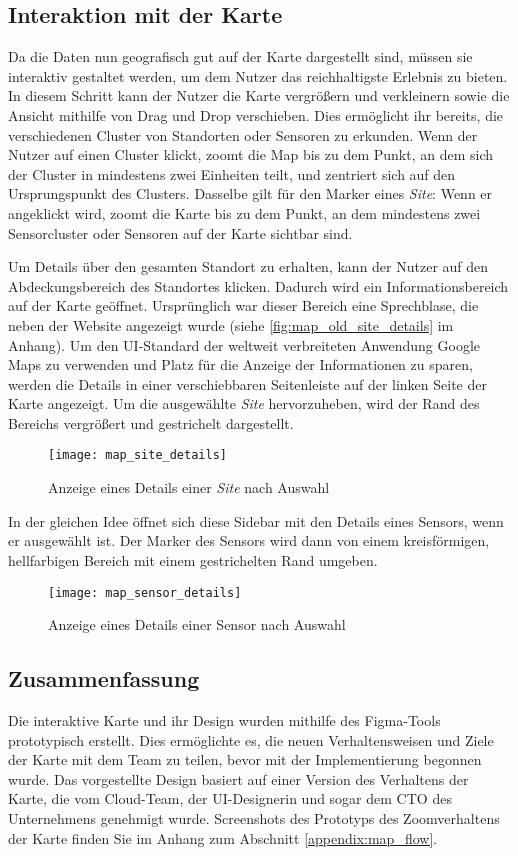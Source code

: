 \subsection{Interaktion mit der Karte}

Da die Daten nun geografisch gut auf der Karte dargestellt sind, müssen sie interaktiv gestaltet werden, um dem Nutzer das reichhaltigste Erlebnis zu bieten.
In diesem Schritt kann der Nutzer die Karte vergrößern und verkleinern sowie die Ansicht mithilfe von Drag und Drop verschieben.
Dies ermöglicht ihr bereits, die verschiedenen Cluster von Standorten oder Sensoren zu erkunden.
Wenn der Nutzer auf einen Cluster klickt, zoomt die Map bis zu dem Punkt, an dem sich der Cluster in mindestens zwei Einheiten teilt, und zentriert sich auf den Ursprungspunkt des Clusters.
Dasselbe gilt für den Marker eines \textit{Site}: Wenn er angeklickt wird, zoomt die Karte bis zu dem Punkt, an dem mindestens zwei Sensorcluster oder Sensoren auf der Karte sichtbar sind.

Um Details über den gesamten Standort zu erhalten, kann der Nutzer auf den Abdeckungsbereich des Standortes klicken.
Dadurch wird ein Informationsbereich auf der Karte geöffnet.
Ursprünglich war dieser Bereich eine Sprechblase, die neben der Website angezeigt wurde (siehe \ref{fig:map_old_site_details} im Anhang).
Um den UI-Standard der weltweit verbreiteten Anwendung Google Maps zu verwenden und Platz für die Anzeige der Informationen zu sparen, werden die Details in einer verschiebbaren Seitenleiste auf der linken Seite der Karte angezeigt.
Um die ausgewählte \textit{Site} hervorzuheben, wird der Rand des Bereichs vergrößert und gestrichelt dargestellt.

\begin{figure}[H]
  \centering
  \texttt{[image: map\_site\_details]}
  \caption{Anzeige eines Details einer \textit{Site} nach Auswahl}
  \label{fig:map_site_details}
\end{figure}

In der gleichen Idee öffnet sich diese Sidebar mit den Details eines Sensors, wenn er ausgewählt ist.
Der Marker des Sensors wird dann von einem kreisförmigen, hellfarbigen Bereich mit einem gestrichelten Rand umgeben.

\begin{figure}[H]
  \centering
  \texttt{[image: map\_sensor\_details]}
  \caption{Anzeige eines Details einer Sensor nach Auswahl}
  \label{fig:map_sensor_details}
\end{figure}

\subsection{Zusammenfassung}

Die interaktive Karte und ihr Design wurden mithilfe des Figma-Tools prototypisch erstellt.
Dies ermöglichte es, die neuen Verhaltensweisen und Ziele der Karte mit dem Team zu teilen, bevor mit der Implementierung begonnen wurde.
Das vorgestellte Design basiert auf einer Version des Verhaltens der Karte, die vom Cloud-Team, der UI-Designerin und sogar dem \ac{CTO} des Unternehmens genehmigt wurde.
Screenshots des Prototyps des Zoomverhaltens der Karte finden Sie im Anhang zum Abschnitt \ref{appendix:map_flow}.
